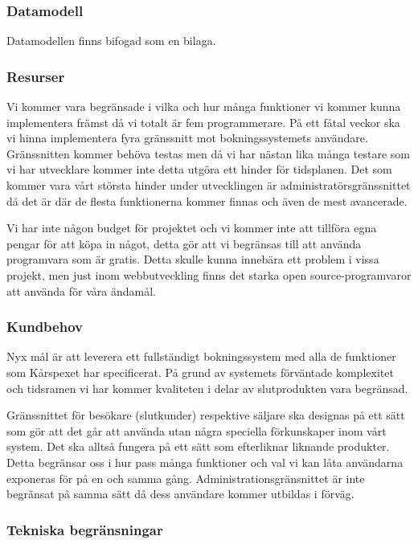 \documentclass[a4paper, twoside, 11pt, titlepage]{article}
\begin{document}
	\subsubsection{Datamodell}


		Datamodellen finns bifogad som en bilaga.

	\subsubsection{Resurser}


		Vi kommer vara begränsade i vilka och hur många funktioner vi kommer kunna implementera främst då vi totalt är fem programmerare. På ett fåtal veckor ska vi hinna implementera fyra gränssnitt mot bokningssystemets användare. Gränssnitten kommer behöva testas men då vi har nästan lika många testare som vi har utvecklare kommer inte detta utgöra ett hinder för tidsplanen. Det som kommer vara vårt största hinder under utvecklingen är administratörsgränssnittet då det är där de flesta funktionerna kommer finnas och även de mest avancerade.

		Vi har inte någon budget för projektet och vi kommer inte att tillföra egna pengar för att köpa in något, detta gör att vi begränsas till att använda programvara som är gratis. Detta skulle kunna innebära ett problem i vissa projekt, men just inom webbutveckling finns det starka open source-programvaror att använda för våra ändamål.

	\subsubsection{Kundbehov}


		Nyx mål är att leverera ett fullständigt bokningssystem med alla de funktioner som Kårspexet har specificerat. På grund av systemets förväntade komplexitet och tidsramen vi har kommer kvaliteten i delar av slutprodukten vara begränsad.

		Gränssnittet för besökare (slutkunder) respektive säljare ska designas på ett sätt som gör att det går att använda utan några speciella förkunskaper inom vårt system. Det ska alltså fungera på ett sätt som efterliknar liknande produkter. Detta begränsar oss i hur pass många funktioner och val vi kan låta användarna exponeras för på en och samma gång. Administrationsgränsnittet är inte begränsat på samma sätt då dess användare kommer utbildas i förväg.

	\subsubsection{Tekniska begränsningar}
\end{document}
